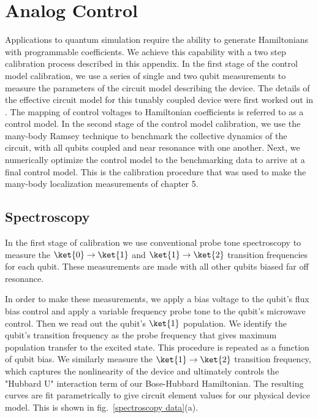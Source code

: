 \chapter[Analog Control]{Analog Control}

Applications to quantum simulation require the ability to generate Hamiltonians with programmable coefficients.
We achieve this capability with a two step calibration process described in this appendix.
In the first stage of the control model calibration, we use a series of single and two qubit measurements to measure
the parameters of the circuit model describing the device.  The details of the effective circuit model for this tunably coupled device were first worked out in \cite{Neill2018}.
The mapping of control voltages to Hamiltonian coefficients is referred to as a control model.
In the second stage of the control model calibration, we use the many-body Ramsey technique to benchmark the collective
dynamics of the circuit, with all qubits coupled and near resonance with one another.
Next, we numerically optimize the control model to the benchmarking data to arrive at a final control model.
This is the calibration procedure that was used to make the many-body localization measurements of chapter 5.

\section{Spectroscopy \label{sec:spectroscopy}}

In the first stage of calibration we use conventional probe tone spectroscopy to measure
the $\ket{0} \rightarrow \ket{1}$ and $\ket{1} \rightarrow \ket{2}$ transition frequencies for each qubit.
These measurements are made with all other qubits biased far off resonance.

In order to make these measurements, we apply a bias voltage to the qubit's flux bias control
and apply a variable frequency probe tone to the qubit's microwave control.
Then we read out the qubit's $\ket{1}$ population.
We identify the qubit's transition frequency as the probe frequency that gives maximum population transfer to the excited state.
This procedure is repeated as a function of qubit bias.
We similarly measure the $\ket{1} \rightarrow \ket{2}$ transition frequency,
which captures the nonlinearity of the device and ultimately controls the "Hubbard U" interaction term of our Bose-Hubbard Hamiltonian.
The resulting curves are fit parametrically to give circuit element values for our physical device model.
This is shown in fig.~\ref{spectroscopy data}(a).

